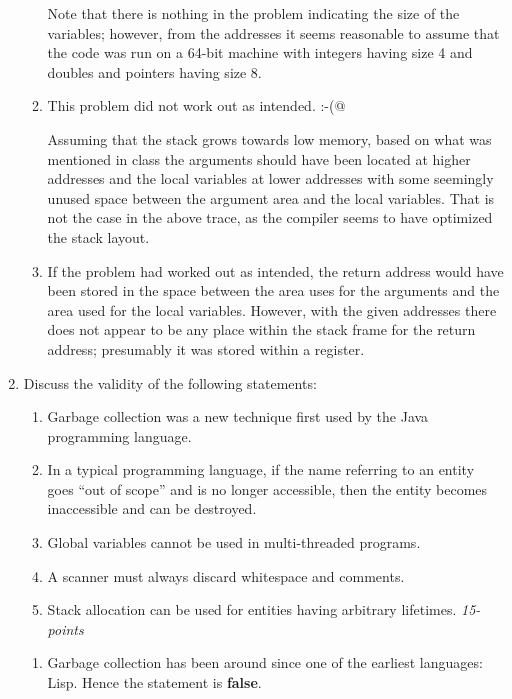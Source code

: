 \documentclass[12pt]{article}
\begin{document}
\begin{enumerate}
\begin{enumerate}
Note that there is nothing in the problem indicating the size of the
variables; however, from the addresses it seems reasonable to assume
that the code was run on a 64-bit machine with integers having size
4 and doubles and pointers having size 8.

\item This problem did not work out as intended. \verb@:-(@

  Assuming that the stack grows towards low memory, based on what was
  mentioned in class the arguments should have been located at higher
  addresses and the local variables at lower addresses with some
  seemingly unused space between the argument area and the local
  variables.  That is not the case in the above trace, as the compiler
  seems to have optimized the stack layout.

\item If the problem had worked out as intended, the return
  address would have been stored in the space between the
  area uses for the arguments and the area used for the local
  variables.  However, with the given addresses there does not
  appear to be any place within the stack frame for the return
  address; presumably it was stored within a register.

  \end{enumerate}

\item Discuss the validity of the following statements:  
  
\begin{enumerate}
\item Garbage collection was a new technique first used by the
  Java programming language.
\item In a typical programming language, if the name referring to an
  entity goes ``out of scope'' and is no longer accessible, then the
  entity becomes inaccessible and can be destroyed.

\item Global variables cannot be used in multi-threaded programs.

\item A scanner must always discard whitespace and comments.

\item Stack allocation can be used for entities having arbitrary
  lifetimes. \hfill\textit{15-points}

\end{enumerate}

\begin{enumerate}
\item Garbage collection has been around since one of the earliest
  languages: Lisp.  Hence the statement is \textbf{false}.
  

\end{enumerate}
\end{enumerate}
\end{document}
